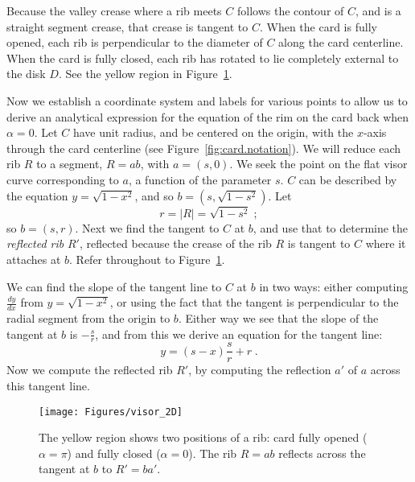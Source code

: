 \pdfoutput=1  \documentclass[]{article}
\newcommand{\eqnlab}[1]{\label{eq:#1}}
\newcommand{\figlab}[1]{\label{fig:#1}}
\newcommand{\figref}[1]{\ref{fig:#1}}
\def\a{{\alpha}}
\begin{document}
Because the valley crease where a rib meets $C$ follows the contour of $C$, and is a straight segment crease,
that crease is tangent to $C$. 
When the card is fully opened, each rib is perpendicular to the diameter of $C$ along the card centerline.
When the card is fully closed, each rib has rotated to lie completely external to the disk $D$.
See the yellow region in Figure~\figref{visor.2D}.

Now we establish a coordinate system and labels for various points to allow us to
derive an analytical expression for the equation of the rim on the card back when $\a=0$.
Let $C$ have unit radius, and be centered on the origin, with the $x$-axis through
the card centerline (see Figure~\figref{card.notation}).  We will reduce each rib $R$ to a segment, $R=ab$, with
$a=(s,0)$.
We seek the point on the flat visor curve corresponding to $a$, a function of the parameter $s$.
$C$ can be described by the equation $y=\sqrt{1-x^2}$, and so
$b=(s, \sqrt{1-s^2})$. 
Let 
$$
r = |R| = \sqrt{1-s^2} \; ;
\eqnlab{req}
$$
so $b=(s,r)$.
Next we find the tangent to $C$ at $b$, and use that to determine the \emph{reflected rib} $R'$,
reflected because the crease of the rib $R$ is tangent to $C$ where it attaches at $b$.
Refer throughout to Figure~\figref{visor.2D}.



We can find the slope of the tangent line to $C$
at $b$ in two ways: either computing $\frac{dy}{dx}$ from $y=\sqrt{1-x^2}$,
or using the fact that the tangent is perpendicular to the radial segment from
the origin to $b$.  Either way we see that the slope of the tangent at $b$
is $-\frac{s}{r}$, and from this we derive an equation for the tangent line:
\begin{equation}
y = (s-x) \frac{s}{r} + r \; .
\eqnlab{tangent.line}
\end{equation}
Now we compute the reflected rib $R'$, by computing the reflection $a'$ of $a$ across this tangent line.

\begin{figure}[htbp]
\centering
\texttt{[image: Figures/visor\_2D]}
\caption{The yellow region shows two positions of a rib: 
card fully opened ($\a=\pi$) and fully closed ($\a=0$).
The rib $R=ab$ reflects across the tangent at $b$ to $R'=ba'$.
}
\figlab{visor.2D}
\end{figure}
\end{document}
